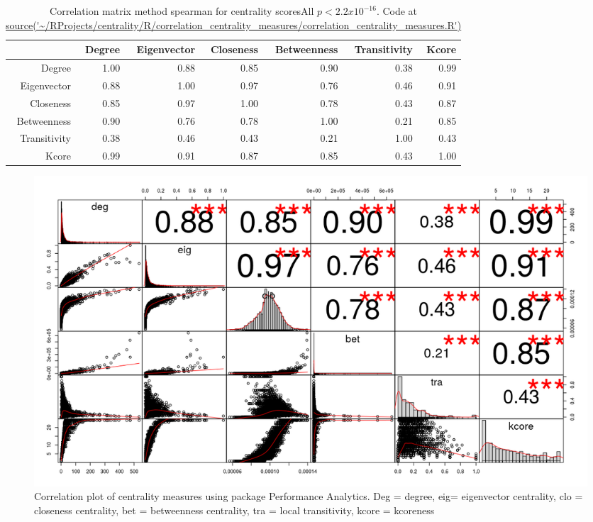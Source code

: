 

\begin{table}[ht]
\centering
\begin{tabular}{rrrrrrr}
  \hline
 & Degree & Eigenvector & Closeness & Betweenness & Transitivity & Kcore \\ 
  \hline
Degree & 1.00 & 0.88 & 0.85 & 0.90 & 0.38 & 0.99 \\ 
  Eigenvector & 0.88 & 1.00 & 0.97 & 0.76 & 0.46 & 0.91 \\ 
  Closeness & 0.85 & 0.97 & 1.00 & 0.78 & 0.43 & 0.87 \\ 
  Betweenness & 0.90 & 0.76 & 0.78 & 1.00 & 0.21 & 0.85 \\ 
  Transitivity & 0.38 & 0.46 & 0.43 & 0.21 & 1.00 & 0.43 \\ 
  Kcore & 0.99 & 0.91 & 0.87 & 0.85 & 0.43 & 1.00 \\ 
   \hline
\end{tabular}
\caption{Correlation matrix method spearman for centrality scoresAll $p < 2.2 x 10^{-16}$. Code at \url{source('~/RProjects/centrality/R/correlation_centrality_measures/correlation_centrality_measures.R')}}
\label{tab:Correlation between vertex centrality measures for PSP. Spearman's rho}
\end{table}

\begin{figure}
    \centering
    \includegraphics[width=\textwidth]{Rplot_corr_spearman_using_package_performance_analytics.png}
    \caption{Correlation plot of centrality measures using package Performance Analytics. Deg = degree, eig= eigenvector centrality, clo = closeness centrality, bet = betweenness centrality, tra = local transitivity, kcore = kcoreness}
    \label{fig:Correlation plot centrality performance analytics}
\end{figure}




